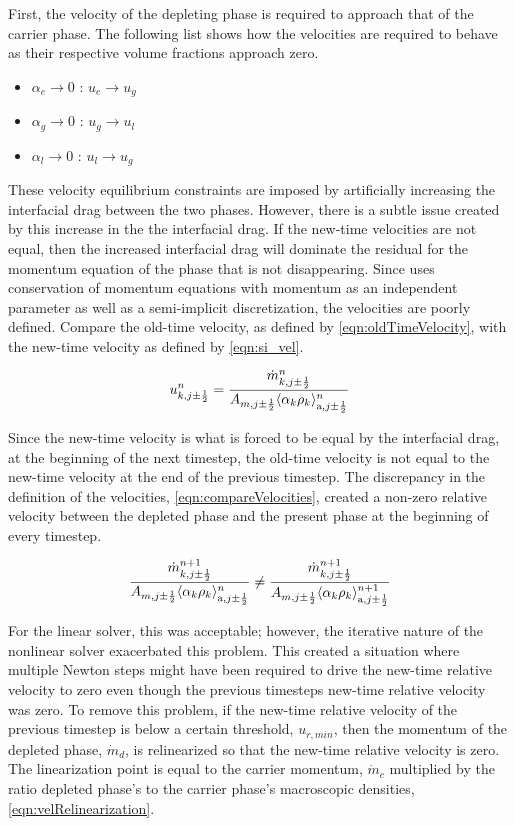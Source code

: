 First, the velocity of the depleting phase is required to approach that of the carrier phase.
The following list shows how the velocities are required to behave as their respective volume fractions approach zero.
\begin{itemize}
\item{ $\alpha_e \rightarrow 0$ : $u_e \rightarrow u_g$}
\item{ $\alpha_g \rightarrow 0$ : $u_g \rightarrow u_l$}
\item{ $\alpha_l \rightarrow 0$ : $u_l \rightarrow u_g$}
\end{itemize}
These velocity equilibrium constraints are imposed by artificially increasing the interfacial drag between the two phases.
However, there is a subtle issue created by this increase in the the interfacial drag.
If the new-time velocities are not equal, then the increased interfacial drag will dominate the residual for the momentum equation of the phase that is not disappearing.
Since \cobra{} uses conservation of momentum equations with momentum as an independent parameter as well as a semi-implicit discretization, the velocities are poorly defined.
Compare the old-time velocity, as defined by \eqref{eqn:oldTimeVelocity}, with the new-time velocity as defined by \eqref{eqn:si_vel}.

\begin{equation}
\label{eqn:oldTimeVelocity}
u^{n}_{k, j \pm \onehalf} = \frac{\dot{m}^{n}_{k, j \pm \onehalf}}{A_{m, j \pm \onehalf} \ave{\alpha_{k} \rho_{k}}^{n}_{\text{a}, j \pm \onehalf}} 
\end{equation}

Since the new-time velocity is what is forced to be equal by the interfacial drag, at the beginning of the next timestep, the old-time velocity is not equal to the new-time velocity at the end of the previous timestep.
The discrepancy in the definition of the velocities, \eqref{eqn:compareVelocities}, created a non-zero relative velocity between the depleted phase and the present phase at the beginning of every timestep.

\begin{equation}
\label{eqn:compareVelocities}
\frac{\dot{m}^{n+1}_{k, j \pm \onehalf}}{A_{m, j \pm \onehalf} \ave{\alpha_{k} \rho_{k}}^{n}_{\text{a}, j \pm \onehalf}} \neq \frac{\dot{m}^{n+1}_{k, j \pm \onehalf}}{A_{m, j \pm \onehalf} \ave{\alpha_{k} \rho_{k}}^{n+1}_{\text{a}, j \pm \onehalf}}
\end{equation}

For the linear solver, this was acceptable; however, the iterative nature of the nonlinear solver exacerbated this problem.
This created a situation where multiple Newton steps might have been required to drive the new-time relative velocity to zero even though the previous timesteps new-time relative velocity was zero.
To remove this problem, if the new-time relative velocity of the previous timestep is below a certain threshold, $u_{r, min}$, then the momentum of the depleted phase, $\dot{m}_{d}$, is relinearized so that the new-time relative velocity is zero.
The linearization point is equal to the carrier momentum, $\dot{m}_{c}$ multiplied by the ratio depleted phase's to the carrier phase's macroscopic densities, \eqref{eqn:velRelinearization}.

